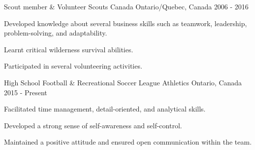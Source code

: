 

\begin{cventries}

  \cventry
    {Scout member \& Volunteer} %
    {Scouts Canada} %
    {Ontario/Quebec, Canada} %
    {2006 - 2016} %
    {
      \begin{cvitems} %
        \item {Developed knowledge about several business skills such as teamwork, leadership, problem-solving, and adaptability.}
        \item {Learnt critical wilderness survival abilities.}
        \item {Participated in several volunteering activities.}
      \end{cvitems}
    }

\cventry
  {High School Football \& Recreational Soccer League} %
  {Athletics} %
  {Ontario, Canada} %
  {2015 - Present} %
  {
    \begin{cvitems} %
      \item {Facilitated time management, detail-oriented, and analytical skills.}
      \item {Developed a strong sense of self-awareness and self-control.}
      \item {Maintained a positive attitude and ensured open communication within the team.}
    \end{cvitems}
  }

\end{cventries}
